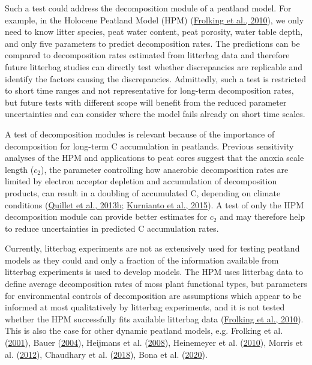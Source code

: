 \documentclass[
  12pt,
]{article}
\begin{document}
Such a test could address the decomposition module of a peatland model. For example, in the Holocene Peatland Model (HPM) (\protect\hyperlink{ref-Frolking.2010}{Frolking et al., 2010}), we only need to know litter species, peat water content, peat porosity, water table depth, and only five parameters to predict decomposition rates. The predictions can be compared to decomposition rates estimated from litterbag data and therefore future litterbag studies can directly test whether discrepancies are replicable and identify the factors causing the discrepancies. Admittedly, such a test is restricted to short time ranges and not representative for long-term decomposition rates, but future tests with different scope will benefit from the reduced parameter uncertainties and can consider where the model fails already on short time scales.

A test of decomposition modules is relevant because of the importance of decomposition for long-term C accumulation in peatlands. Previous sensitivity analyses of the HPM and applications to peat cores suggest that the anoxia scale length (\(c_2\)), the parameter controlling how anaerobic decomposition rates are limited by electron acceptor depletion and accumulation of decomposition products, can result in a doubling of accumulated C, depending on climate conditions (\protect\hyperlink{ref-Quillet.2013a}{Quillet et al., 2013b}; \protect\hyperlink{ref-Kurnianto.2015}{Kurnianto et al., 2015}). A test of only the HPM decomposition module can provide better estimates for \(c_2\) and may therefore help to reduce uncertainties in predicted C accumulation rates.

Currently, litterbag experiments are not as extensively used for testing peatland models as they could and only a fraction of the information available from litterbag experiments is used to develop models. The HPM uses litterbag data to define average decomposition rates of moss plant functional types, but parameters for environmental controls of decomposition are assumptions which appear to be informed at most qualitatively by litterbag experiments, and it is not tested whether the HPM successfully fits available litterbag data (\protect\hyperlink{ref-Frolking.2010}{Frolking et al., 2010}). This is also the case for other dynamic peatland models, e.g. Frolking et al. (\protect\hyperlink{ref-Frolking.2001}{2001}), Bauer (\protect\hyperlink{ref-Bauer.2004}{2004}), Heijmans et al. (\protect\hyperlink{ref-Heijmans.2008}{2008}), Heinemeyer et al. (\protect\hyperlink{ref-Heinemeyer.2010}{2010}), Morris et al. (\protect\hyperlink{ref-Morris.2012}{2012}), Chaudhary et al. (\protect\hyperlink{ref-Chaudhary.2018}{2018}), Bona et al. (\protect\hyperlink{ref-Bona.2020}{2020}).
\end{document}
